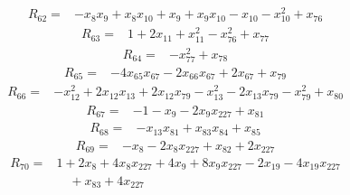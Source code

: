 \begin{equation*}\begin{split}
R_{62}={}&-x_{8} x_{9} + x_{8} x_{10} + x_{9} + x_{9} x_{10} - x_{10} - x_{10}^{2} + x_{76}
\end{split}\end{equation*}
\begin{equation*}\begin{split}
R_{63}={}&1 + 2x_{11} + x_{11}^{2} - x_{76}^{2} + x_{77}
\end{split}\end{equation*}
\begin{equation*}\begin{split}
R_{64}={}&-x_{77}^{2} + x_{78}
\end{split}\end{equation*}
\begin{equation*}\begin{split}
R_{65}={}&-4x_{65} x_{67} - 2x_{66} x_{67} + 2x_{67} + x_{79}
\end{split}\end{equation*}
\begin{equation*}\begin{split}
R_{66}={}&-x_{12}^{2} + 2x_{12} x_{13} + 2x_{12} x_{79} - x_{13}^{2} - 2x_{13} x_{79} - x_{79}^{2} + x_{80}
\end{split}\end{equation*}
\begin{equation*}\begin{split}
R_{67}={}&-1 - x_{9} - 2x_{9} x_{227} + x_{81}
\end{split}\end{equation*}
\begin{equation*}\begin{split}
R_{68}={}&-x_{13} x_{81} + x_{83} x_{84} + x_{85}
\end{split}\end{equation*}
\begin{equation*}\begin{split}
R_{69}={}&-x_{8} - 2x_{8} x_{227} + x_{82} + 2x_{227}
\end{split}\end{equation*}
\begin{equation*}\begin{split}
R_{70}={}&1 + 2x_{8} + 4x_{8} x_{227} + 4x_{9} + 8x_{9} x_{227} - 2x_{19} - 4x_{19} x_{227}\\
&\quad + x_{83} + 4x_{227}
\end{split}\end{equation*}
